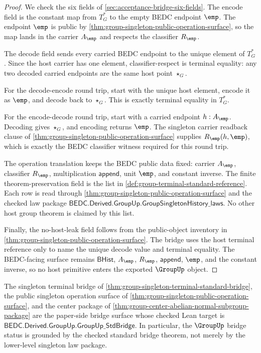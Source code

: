 \begin{proof}
We check the six fields of \autoref{sec:acceptance-bridge-six-fields}. The
encode field is the constant map from $T_G^\ast$ to the empty BEDC endpoint
$\emp$. The endpoint $\emp$ is public by
\autoref{thm:group-singleton-public-operation-surface}, so the map lands in the
carrier $A_{\emp}$ and respects the classifier $R_{\emp}$.

The decode field sends every carried BEDC endpoint to the unique element of
$T_G^\ast$. Since the host carrier has one element, classifier-respect is
terminal equality: any two decoded carried endpoints are the same host point
$\star_G$.

For the decode-encode round trip, start with the unique host element, encode it
as $\emp$, and decode back to $\star_G$. This is exactly terminal equality in
$T_G^\ast$.

For the encode-decode round trip, start with a carried endpoint $h:A_{\emp}$.
Decoding gives $\star_G$, and encoding returns $\emp$. The singleton carrier
readback clause of \autoref{thm:group-singleton-public-operation-surface}
supplies $R_{\emp}(h,\emp)$, which is exactly the BEDC classifier witness
required for this round trip.

The operation translation keeps the BEDC public data fixed: carrier
$A_{\emp}$, classifier $R_{\emp}$, multiplication $\mathsf{append}$, unit
$\emp$, and constant inverse. The finite theorem-preservation field is the list
in \autoref{def:group-terminal-standard-reference}. Each row is read through
\autoref{thm:group-singleton-public-operation-surface} and the checked law
package $\mathsf{BEDC.Derived.GroupUp.GroupSingletonHistory\_laws}$. No other
host group theorem is claimed by this list.

Finally, the no-host-leak field follows from the public-object inventory in
\autoref{thm:group-singleton-public-operation-surface}. The bridge uses the
host terminal reference only to name the unique decode value and terminal
equality. The BEDC-facing surface remains $\mathsf{BHist}$, $A_{\emp}$,
$R_{\emp}$, $\mathsf{append}$, $\emp$, and the constant inverse, so no host
primitive enters the exported $\GroupUp$ object.
\end{proof}
\begin{theorem}
\label{thm:group-standard-bridge-status-synchronization}
The singleton terminal bridge of
\autoref{thm:group-singleton-terminal-standard-bridge}, the public singleton
operation surface of \autoref{thm:group-singleton-public-operation-surface},
and the center package of
\autoref{thm:group-center-abelian-normal-subgroup-package} are the paper-side
bridge surface whose checked Lean target is
$\mathsf{BEDC.Derived.GroupUp.GroupUp\_StdBridge}$. In particular, the
$\GroupUp$ bridge status is grounded by the checked standard bridge theorem,
not merely by the lower-level singleton law package.
\end{theorem}
